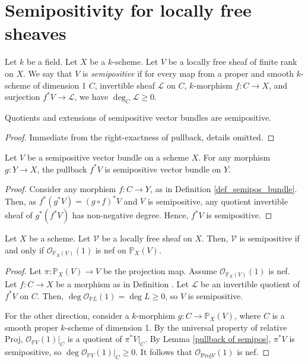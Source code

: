 \section{Semipositivity for locally free sheaves}

\begin{definition}\label{def_semipos_bundle}
Let $k$ be a field.
Let $X$ be a $k$-scheme.
Let $V$ be a locally free sheaf of finite rank on $X$.
We say that $V$ is \textit{semipositive} if for every map from a proper and
smooth $k$-scheme of dimension 1 $C$, invertible sheaf $\mathcal{L}$ on $C$,
$k$-morphism $f:C\to X$, and surjection $f^{*}V\to\mathcal{L}$, we have
$\deg_C\mathcal{L}\ge0$.
\end{definition}


\begin{lemma}
Quotients and extensions of semipositive vector bundles are semipositive.
\end{lemma}

\begin{proof}
Immediate from the right-exactness of pullback, details omitted.
\end{proof}


\begin{lemma}\label{pullback of semipos}
Let $V$ be a semipositive vector bundle on a scheme $X$.
For any morphism $g:Y\to X$, the pullback $f^*V$ is semipositive vector bundle
on $Y$.
\end{lemma}
\begin{proof}
Consider any morphism $f:C\to Y$, as in Definition \ref{def_semipos_bundle}.
Then, as $f^*(g^*V)=(g\circ f)^*V$ and $V$ is semipositive, any quotient
invertible sheaf of $g^*(f^*V)$ has non-negative degree.
Hence, $f^*V$ is semipositive.
\end{proof}

\begin{lemma}\label{semipos=nef}
Let $X$ be a scheme.
Let $\mathcal{V}$ be a locally free sheaf on $X$.
Then, $\mathcal{V}$ is semipositive if and only if
$\mathcal{O}_{\mathbb{P}_X(V)}(1)$ is nef on $\mathbb{P}_X(V)$.
\end{lemma}

\begin{proof}
Let $\pi:\mathbb{P}_X(V)\to V$ be the projection map.
Assume $\mathcal{O}_{\mathbb{P}_X(V)}(1)$ is nef.
Let $f:C\to X$ be a morphism as in Definition \label{def_semipos_bundle}.
Let $\mathcal{L}$ be an invertible quotient of $f^*V$ on $C$.
Then, $\deg \mathcal{O}_{\mathbb{P}L}(1)=\deg L\ge0$, so $V$ is semipositive.

For the other direction, consider a $k$-morphism $g:C\to\mathbb{P}_X(V)$, where
$C$ is a smooth proper $k$-scheme of dimension 1.
By the universal property of relative Proj, $\mathcal{O}_{\mathbb{P}V}(1)|_C$
is a quotient of $\pi^*V|_C$.
By Lemma \ref{pullback of semipos}, $\pi^*V$ is semipositive, so
$\deg\mathcal{O}_{\mathbb{P}V}(1)|_C\geq 0$.
It follows that $\mathcal{O}_{\mathrm{Proj} V}(1)$ is nef.
\end{proof}

